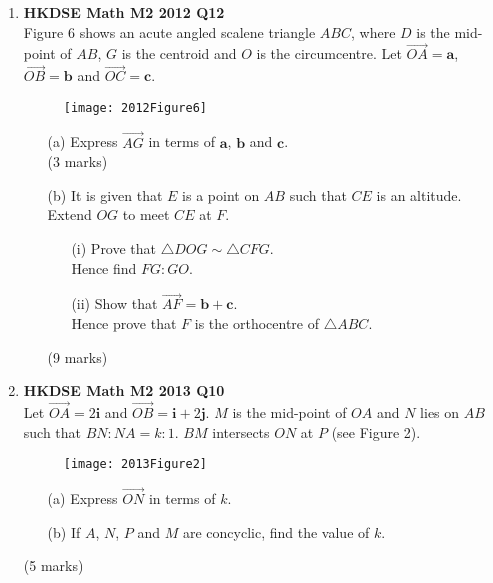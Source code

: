 \documentclass[12pt]{article}
\begin{document}
\begin{enumerate}
	\item \textbf{HKDSE Math M2 2012 Q12}\\
	Figure 6 shows an acute angled scalene triangle $ABC$, where $D$ is the mid-point of $AB$, $G$ is the centroid and $O$ is the circumcentre. Let $\overrightarrow{OA} = \textbf{a}$, $\overrightarrow{OB} = \textbf{b}$ and $\overrightarrow{OC} = \textbf{c}$.
	\begin{figure}[H]
		\centering
		\texttt{[image: 2012Figure6]}
	\end{figure}
	\begin{enumerate}
		\item [(a)]Express $\overrightarrow{AG}$ in terms of $\textbf{a}$, $\textbf{b}$ and $\textbf{c}$.\\(3 marks)
		\item [(b)]It is given that $E$ is a point on $AB$ such that $CE$ is an altitude. Extend $OG$ to meet $CE$ at $F$. 
		\begin{enumerate}
			\item [(i)]Prove that $\triangle DOG \sim \triangle CFG$. \\
			Hence find $FG:GO$. 
			\item [(ii)]Show that $\overrightarrow{AF} = \textbf{b} + \textbf{c}$. \\
			Hence prove that $F$ is the orthocentre of $\triangle ABC$.
		\end{enumerate}
		(9 marks)
	\end{enumerate}
	
	\newpage
	
	\item \textbf{HKDSE Math M2 2013 Q10}\\
	Let $\overrightarrow{OA} = 2\textbf{i}$ and 
	$\overrightarrow{OB} = \textbf{i} +2 \textbf{j}$. $M$ is the mid-point of $OA$ and $N$ lies on $AB$ such that $BN : NA = k: 1$. $BM$ intersects $ON$ at $P$ (see Figure 2).
	\begin{figure}[H]
		\centering
		\texttt{[image: 2013Figure2]}
	\end{figure}
	\begin{enumerate}
		\item [(a)]Express $\overrightarrow{ON}$ in terms of $k$.
		\item [(b)]If $A$, $N$, $P$ and $M$ are concyclic, find the value of $k$.
	\end{enumerate}
	(5 marks)


\end{enumerate}
\end{document}
